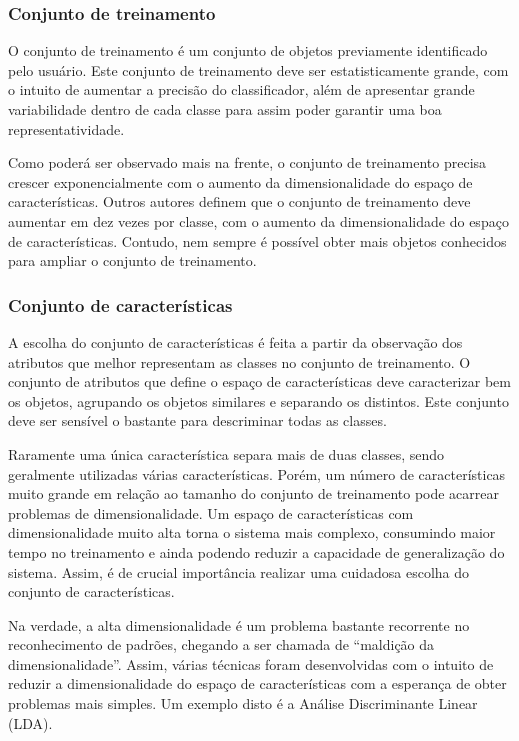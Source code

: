 \subsubsection{Conjunto de treinamento}

O conjunto de treinamento é um conjunto de objetos previamente
identificado pelo usuário. Este conjunto de treinamento deve ser
estatisticamente grande, com o intuito de aumentar a precisão do
classificador, além de apresentar grande variabilidade dentro de cada
classe para assim poder garantir uma boa representatividade.

Como poderá ser observado mais na frente, o conjunto de treinamento
precisa crescer exponencialmente com o aumento da dimensionalidade do
espaço de características.\cite{120} Outros autores definem que o
conjunto de treinamento deve aumentar em dez vezes por classe, com o
aumento da dimensionalidade do espaço de características.\cite{119}
Contudo, nem sempre é possível obter mais objetos conhecidos para
ampliar o conjunto de treinamento.

\subsubsection{Conjunto de características}

A escolha do conjunto de características é feita a partir da
observação dos atributos que melhor representam as classes no conjunto
de treinamento. O conjunto de atributos que define o espaço de
características deve caracterizar bem os objetos, agrupando os objetos
similares e separando os distintos. Este conjunto deve ser sensível o
bastante para descriminar todas as classes.

Raramente uma única característica separa mais de duas classes, sendo
geralmente utilizadas várias características. Porém, um número de
características muito grande em relação ao tamanho do conjunto de
treinamento pode acarrear problemas de dimensionalidade. Um espaço de
características com dimensionalidade muito alta torna o sistema mais
complexo, consumindo maior tempo no treinamento e ainda podendo
reduzir a capacidade de generalização do sistema.\cite{121} Assim, é
de crucial importância realizar uma cuidadosa escolha do conjunto de
características.

Na verdade, a alta dimensionalidade é um problema bastante recorrente
no reconhecimento de padrões, chegando a ser chamada de ``maldição da
dimensionalidade''. Assim, várias técnicas foram desenvolvidas com o
intuito de reduzir a dimensionalidade do espaço de características com
a esperança de obter problemas mais simples. Um exemplo disto é a
Análise Discriminante Linear (LDA).\cite{120}

